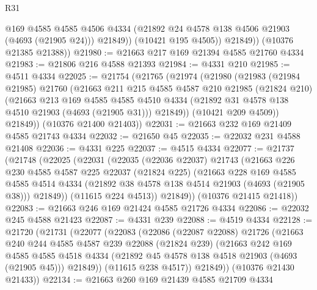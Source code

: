 \begin{lexlean}{R31}
\begin{coremodule}
                @169
                @4585
                @4585
                @4506
                @4334
                (@21892 @24 @4578 @138 @4506 @21903 (@4693 (@21905 @24)))
                @21849))
            (@10421 @195 @4505))
          @21849))
      (@10376 @21385 @21388))
@21980 := @21663 @217 @169 @21394 @4585 @21760 @4334
@21983 := @21806 @216 @4588 @21393
@21984 := @4331 @210
@21985 := @4511 @4334
@22025 := @21754
    (@21765
      (@21974
        (@21980
          (@21983
            (@21984 @21985)
            @21760
            (@21663
              @211
              @215
              @4585
              @4587
              @210
              @21985
              (@21824 @210)
              (@21663
                @213
                @169
                @4585
                @4585
                @4510
                @4334
                (@21892 @31 @4578 @138 @4510 @21903 (@4693 (@21905 @31)))
                @21849))
            (@10421 @209 @4509))
          @21849))
      (@10376 @21400 @21403))
@22031 := @21663 @232 @169 @21409 @4585 @21743 @4334
@22032 := @21650 @45
@22035 := @22032 @231 @4588 @21408
@22036 := @4331 @225
@22037 := @4515 @4334
@22077 := @21737
    (@21748
      (@22025
        (@22031
          (@22035
            (@22036 @22037)
            @21743
            (@21663
              @226
              @230
              @4585
              @4587
              @225
              @22037
              (@21824 @225)
              (@21663
                @228
                @169
                @4585
                @4585
                @4514
                @4334
                (@21892 @38 @4578 @138 @4514 @21903 (@4693 (@21905 @38)))
                @21849))
            (@11615 @224 @4513))
          @21849))
      (@10376 @21415 @21418))
@22083 := @21663 @246 @169 @21424 @4585 @21726 @4334
@22086 := @22032 @245 @4588 @21423
@22087 := @4331 @239
@22088 := @4519 @4334
@22128 := @21720
    (@21731
      (@22077
        (@22083
          (@22086
            (@22087 @22088)
            @21726
            (@21663
              @240
              @244
              @4585
              @4587
              @239
              @22088
              (@21824 @239)
              (@21663
                @242
                @169
                @4585
                @4585
                @4518
                @4334
                (@21892 @45 @4578 @138 @4518 @21903 (@4693 (@21905 @45)))
                @21849))
            (@11615 @238 @4517))
          @21849))
      (@10376 @21430 @21433))
@22134 := @21663 @260 @169 @21439 @4585 @21709 @4334

\end{coremodule}
\end{lexlean}
